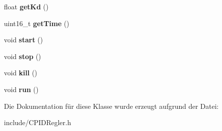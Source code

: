 \begin{DoxyCompactItemize}
\item 
\hypertarget{class_c_p_i_d_regler_ac7407cdca458abb7fb830edd87ae8748}{float {\bfseries get\-Kd} ()}\label{class_c_p_i_d_regler_ac7407cdca458abb7fb830edd87ae8748}

\item 
\hypertarget{class_c_p_i_d_regler_a7785f43ec48ca84323ada78d27af45f1}{uint16\-\_\-t {\bfseries get\-Time} ()}\label{class_c_p_i_d_regler_a7785f43ec48ca84323ada78d27af45f1}

\item 
\hypertarget{class_c_p_i_d_regler_a78cbfbd338c7608b070397b9658911cb}{void {\bfseries start} ()}\label{class_c_p_i_d_regler_a78cbfbd338c7608b070397b9658911cb}

\item 
\hypertarget{class_c_p_i_d_regler_a04dd1b9a412f5bfaa6741d3354b1fe69}{void {\bfseries stop} ()}\label{class_c_p_i_d_regler_a04dd1b9a412f5bfaa6741d3354b1fe69}

\item 
\hypertarget{class_c_p_i_d_regler_a50419ad1c3923f7e7d8b67dc17f5cf24}{void {\bfseries kill} ()}\label{class_c_p_i_d_regler_a50419ad1c3923f7e7d8b67dc17f5cf24}

\item 
\hypertarget{class_c_p_i_d_regler_a92cbd69baca2de5c4cb57b43e47e14cf}{void {\bfseries run} ()}\label{class_c_p_i_d_regler_a92cbd69baca2de5c4cb57b43e47e14cf}

\end{DoxyCompactItemize}


\-Die \-Dokumentation für diese \-Klasse wurde erzeugt aufgrund der \-Datei\-:\begin{DoxyCompactItemize}
\item 
include/\-C\-P\-I\-D\-Regler.\-h\end{DoxyCompactItemize}
